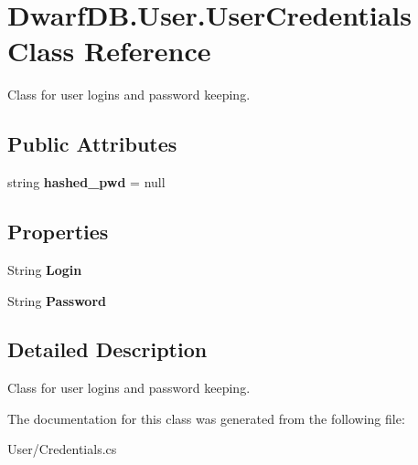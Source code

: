 \hypertarget{class_dwarf_d_b_1_1_user_1_1_user_credentials}{
\section{DwarfDB.User.UserCredentials Class Reference}
\label{class_dwarf_d_b_1_1_user_1_1_user_credentials}
}


Class for user logins and password keeping.  


\subsection*{Public Attributes}
\begin{DoxyCompactItemize}
\item 
\hypertarget{class_dwarf_d_b_1_1_user_1_1_user_credentials_a709a6c58fefe81c94e4e57a045605747}{
string {\bfseries hashed\_\-pwd} = null}
\label{class_dwarf_d_b_1_1_user_1_1_user_credentials_a709a6c58fefe81c94e4e57a045605747}

\end{DoxyCompactItemize}
\subsection*{Properties}
\begin{DoxyCompactItemize}
\item 
\hypertarget{class_dwarf_d_b_1_1_user_1_1_user_credentials_a425f41d9c436edd834855475d5a7a554}{
String {\bfseries Login}}
\label{class_dwarf_d_b_1_1_user_1_1_user_credentials_a425f41d9c436edd834855475d5a7a554}

\item 
\hypertarget{class_dwarf_d_b_1_1_user_1_1_user_credentials_ad74f3703718cd5f901e4b7fa0a704244}{
String {\bfseries Password}}
\label{class_dwarf_d_b_1_1_user_1_1_user_credentials_ad74f3703718cd5f901e4b7fa0a704244}

\end{DoxyCompactItemize}


\subsection{Detailed Description}
Class for user logins and password keeping. 

The documentation for this class was generated from the following file:\begin{DoxyCompactItemize}
\item 
User/Credentials.cs\end{DoxyCompactItemize}
